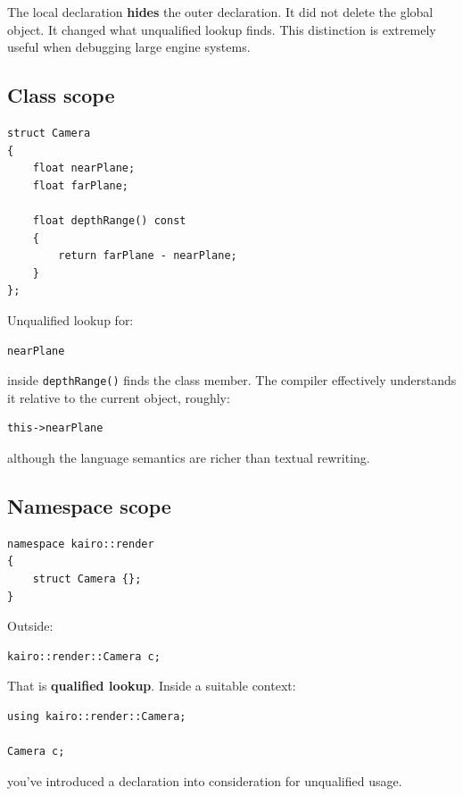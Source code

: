 The local declaration \textbf{hides} the outer declaration. It did not delete the global object. It changed what unqualified lookup finds. This distinction is extremely useful when debugging large engine systems.

\subsection{Class scope}\label{05-engine-i-ch002-class-scope}

\begin{verbatim}
struct Camera
{
    float nearPlane;
    float farPlane;

    float depthRange() const
    {
        return farPlane - nearPlane;
    }
};
\end{verbatim}

Unqualified lookup for:

\begin{verbatim}
nearPlane
\end{verbatim}

inside \texttt{depthRange()} finds the class member. The compiler effectively understands it relative to the current object, roughly:

\begin{verbatim}
this->nearPlane
\end{verbatim}

although the language semantics are richer than textual rewriting.

\subsection{Namespace scope}\label{05-engine-i-ch002-namespace-scope}

\begin{verbatim}
namespace kairo::render
{
    struct Camera {};
}
\end{verbatim}

Outside:

\begin{verbatim}
kairo::render::Camera c;
\end{verbatim}

That is \textbf{qualified lookup}. Inside a suitable context:

\begin{verbatim}
using kairo::render::Camera;

Camera c;
\end{verbatim}

you've introduced a declaration into consideration for unqualified usage.

